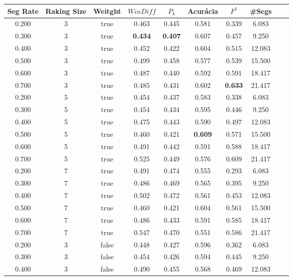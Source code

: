 \documentclass{article}
\begin{document}
\begin{longtable}[c]{|c|c|c|c|c|c|c|c|c|c|} 
\hline 
 Seg Rate & Raking Size & Weitght & $WinDiff$ & $P_k$ & Acurácia & $F^1$ & \#Segs\\ \hline 
 0.200 & 3 & true & 0.463 & 0.445 & 0.581 & 0.339 & 6.083  \\ \hline 
 0.300 & 3 & true & \cellcolor{gray!20} \textbf{0.434} & \cellcolor{gray!20} \textbf{0.407} & 0.607 & 0.457 & 9.250  \\ \hline 
 0.400 & 3 & true & 0.452 & 0.422 & 0.604 & 0.515 & 12.083  \\ \hline 
 0.500 & 3 & true & 0.499 & 0.458 & 0.577 & 0.539 & 15.500  \\ \hline 
 0.600 & 3 & true & 0.487 & 0.440 & 0.592 & 0.591 & 18.417  \\ \hline 
 0.700 & 3 & true & 0.485 & 0.431 & 0.602 & \cellcolor{gray!20} \textbf{0.633} & 21.417  \\ \hline 
 0.200 & 5 & true & 0.454 & 0.437 & 0.583 & 0.338 & 6.083  \\ \hline 
 0.300 & 5 & true & 0.454 & 0.434 & 0.595 & 0.446 & 9.250  \\ \hline 
 0.400 & 5 & true & 0.475 & 0.443 & 0.590 & 0.497 & 12.083  \\ \hline 
 0.500 & 5 & true & 0.460 & 0.421 & \cellcolor{gray!20} \textbf{0.609} & 0.571 & 15.500  \\ \hline 
 0.600 & 5 & true & 0.491 & 0.442 & 0.591 & 0.588 & 18.417  \\ \hline 
 0.700 & 5 & true & 0.525 & 0.449 & 0.576 & 0.609 & 21.417  \\ \hline 
 0.200 & 7 & true & 0.491 & 0.474 & 0.555 & 0.293 & 6.083  \\ \hline 
 0.300 & 7 & true & 0.486 & 0.469 & 0.565 & 0.395 & 9.250  \\ \hline 
 0.400 & 7 & true & 0.502 & 0.472 & 0.561 & 0.453 & 12.083  \\ \hline 
 0.500 & 7 & true & 0.460 & 0.421 & 0.604 & 0.561 & 15.500  \\ \hline 
 0.600 & 7 & true & 0.486 & 0.433 & 0.591 & 0.585 & 18.417  \\ \hline 
 0.700 & 7 & true & 0.547 & 0.470 & 0.551 & 0.586 & 21.417  \\ \hline 
 0.200 & 3 & false & 0.448 & 0.427 & 0.596 & 0.362 & 6.083  \\ \hline 
 0.300 & 3 & false & 0.454 & 0.426 & 0.594 & 0.445 & 9.250  \\ \hline 
 0.400 & 3 & false & 0.490 & 0.455 & 0.568 & 0.469 & 12.083  \\ \hline 

\end{longtable}
\end{document}
